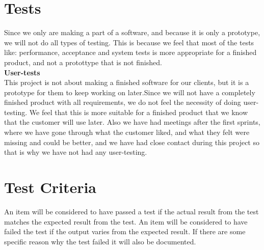 \documentclass{report}
\begin{document}
\section{Tests} \label{sec:tests}
Since we only are making a part of a software, and because it is only a prototype, we will not do all types of testing. This is because we feel that most of the tests like: performance, acceptance and system tests is more appropriate for a finished product, and not a protottype that is not finished. \\
\textbf{User-tests} \\
This project is not about making a finished software for our clients, but it is a prototype for them to keep working on later.Since we will not have a completely finished product with all requirements, we do not feel the necessity of doing user-testing. We feel that this is more suitable for a finished product that we know that the customer will use later. Also we have had meetings after the first sprints, where we have gone through what the customer liked, and what they felt were missing and could be better, and we have had close contact during this project so that is why we have not had any user-testing.

\newpage
\section{Test Criteria} \label{sec:test_criteria}
An item will be considered to have passed a test if the actual result from the test matches the expected result from the test. An item will be considered to have failed the test if the output varies from the expected result. If there are some specific reason why the test failed it will also be documented.

\newpage
\end{document}
